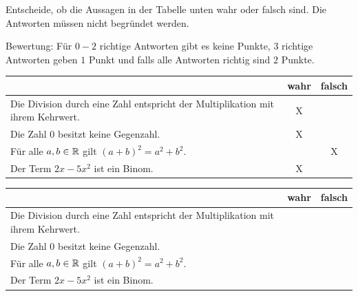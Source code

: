 \documentclass[11pt]{exam}
\begin{document}
\begin{questions}
{
}

\question[2]
Entscheide, ob die Aussagen in der Tabelle unten wahr oder falsch sind. Die Antworten müssen nicht begründet werden.\newline
\begin{small}
	Bewertung: Für $0-2$ richtige Antworten gibt es keine Punkte, $3$ richtige Antworten geben $1$ Punkt und falls alle Antworten richtig sind $2$ Punkte.
\end{small}
{\begin{solution}
	\begingroup
	\renewcommand{\arraystretch}{1.5}
	\begin{table}[H]
		\centering
		\begin{tabular}{|p{12cm}|c|c|}\hline
			& wahr & falsch\\\hline
			Die Division durch eine Zahl entspricht der Multiplikation mit ihrem Kehrwert. & X & \\\hline
			Die Zahl $0$ besitzt keine Gegenzahl. & X & \\\hline
			Für alle $a,b\in\mathbb{R}$ gilt $(a+b)^2=a^2+b^2$. & & X \\\hline
			Der Term $2x-5x^2$ ist ein Binom. & X & \\\hline
		\end{tabular}
	\end{table}
	\endgroup
\end{solution}}
{\begingroup
\renewcommand{\arraystretch}{1.5}
\begin{table}[H]
	\centering
	\begin{tabular}{|p{12cm}|c|c|}\hline
		& wahr & falsch\\\hline
		Die Division durch eine Zahl entspricht der Multiplikation mit ihrem Kehrwert. & & \\\hline
		Die Zahl $0$ besitzt keine Gegenzahl. & & \\\hline
		Für alle $a,b\in\mathbb{R}$ gilt $(a+b)^2=a^2+b^2$. & & \\\hline
		Der Term $2x-5x^2$ ist ein Binom. & & \\\hline
	\end{tabular}
\end{table}
\endgroup}



\end{questions}
\end{document}
